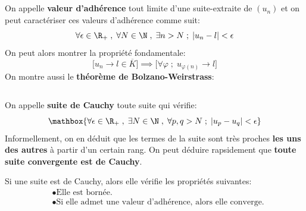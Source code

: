 \subsection*{}
On appelle \textbf{valeur d'adhérence} tout limite d'une suite-extraite de \((u_n)\) et on peut caractériser ces valeurs d'adhérence comme suit:
\[
    \forall \epsilon \in \R_+ \; , \; \forall N \in \N \; , \; \exists n > N \; ; \; |u_n - l| < \epsilon 
\]
On peut alors montrer la propriété fondamentale:
\[
    \Bigr[u_n \rightarrow l \in \overline{K} \Bigr] \implies \Bigr[ \forall \varphi \; ; \; u_{\varphi(n)} \rightarrow l \Bigr]
\]
On montre aussi le \textbf{théorème de Bolzano-Weirstrass}:
\begin{center}
\end{center}

\subsection*{}
On appelle \textbf{suite de Cauchy} toute suite qui vérifie:
\[
    \mathbox{
        \forall \epsilon \in \R_+ \; , \; \exists N \in \N \; , \; \forall p, q > N \; ; \; |u_p - u_q| < \epsilon 
    }
\]
Informellement, on en déduit que les termes de la suite sont très proches \textbf{les uns des autres} à partir d'un certain rang.\+
On peut déduire rapsidement que \textbf{toute suite convergente est de Cauchy}.\<

Si une suite est de Cauchy, alors elle vérifie les propriétés suivantes:
\begin{align*}
    &\bullet \text{Elle est bornée.} \\
    &\bullet \text{Si elle admet une valeur d'adhérence, alors elle converge.}
\end{align*}

